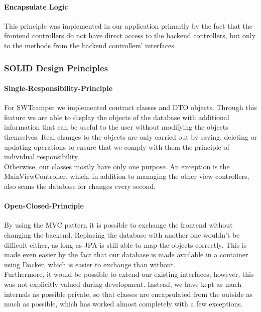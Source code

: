 \paragraph{Encapsulate Logic}
This principle was implemented in our application primarily by the fact that the frontend controllers do not have direct access to the backend controllers, but only to the methods from the backend controllers' interfaces.

\subsubsection{SOLID Design Principles}

\paragraph{Single-Responsibility-Principle}
\label{subsec:solid:srp}
For SWTcamper we implemented contract classes and DTO objects. Through this
feature we are able to display the objects of the database with additional information that
can be useful to the user without modifying the objects themselves. Real changes to the objects
are only carried out by saving, deleting or updating operations to ensure that we comply with them
the principle of individual responsibility. \\
Otherwise, our classes mostly have only one purpose. An exception is the MainViewController, which, in addition to managing the other view controllers, also scans the database for changes every second.

\paragraph{Open-Closed-Principle}
\label{subsec:solid:ocp}
By using the MVC pattern it is possible to exchange the frontend without changing the backend. Replacing the database with another one wouldn't be difficult either, as long as JPA is still able to map the objects correctly. This is made even easier by the fact that our database is made available in a container using Docker, which is easier to exchange than without. \\
Furthermore, it would be possible to extend our existing interfaces; however, this was not explicitly valued during development. Instead, we have kept as much internals as possible private, so that classes are encapsulated from the outside as much as possible, which has worked almost completely with a few exceptions.

